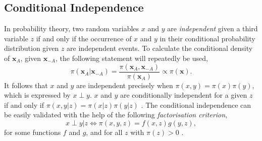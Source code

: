 \subsection{Conditional Independence}
In probability theory, two random variables $x$ and $y$ are \textit{independent} given a third variable $z$ if and only if the occurrence of $x$ and $y$ in their conditional probability distribution given $z$ are independent events. To calculate the conditional density of $\pmb{x}_A$, given $\pmb{x}_{-A}$, the following statement will repeatedly be used,
\begin{equation}
    \pi\left(\pmb{x}_A|\pmb{x}_{-A}\right)=\frac{\pi\left(\pmb{x}_A,\pmb{x}_{-A}\right)}{\pi\left(\pmb{x}_{A}\right)}\propto \pi\left(\pmb{x}\right).
\end{equation}
It follows that $x$ and $y$ are independent precisely when $\pi\left(x,y\right)=\pi\left(x\right)\pi\left(y\right)$, which is expressed by $x\perp y$. $x$ and $y$ are conditionally independent for a given $z$ if and only if $\pi\left(x,y|z\right)=\pi\left(x|z\right)\pi\left(y|z\right)$ \autocite[][]{dawid1979conditional}. The conditional independence can be easily validated with the help of the following \textit{factorisation criterion},
\begin{equation}
    x\perp y|z\Longleftrightarrow \pi\left(x,y,z\right)=f\left(x,z\right)g\left(y,z\right),
\end{equation}
for some functions $f$ and $g$, and for all $z$ with $\pi\left(z\right) >0$ \autocite[][16--17]{rue2005gaussian}.
